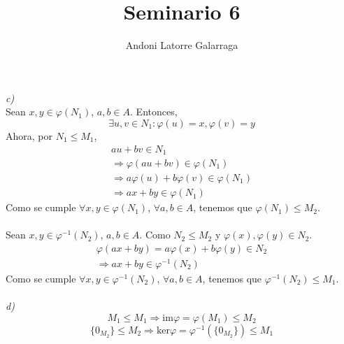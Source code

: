 \documentclass{article}
\title{Seminario 6}
\author{Andoni Latorre Galarraga}
\date{}
\begin{document}
\maketitle
\begin{multicols}{2}
\section{}
\noindent\textit{c)}\\
Sean $x,y\in \varphi(N_1)$, $a,b\in A$. Entonces,
$$
\exists u,v\in N_1 : \varphi(u)=x, \varphi(v)=y
$$
Ahora, por $N_1 \le M_1$,
$$
\begin{array}{c}
au+bv\in N_1 \\
\Rightarrow \varphi(au+bv)\in\varphi(N_1) \\
\Rightarrow a\varphi(u)+b\varphi(v)\in\varphi(N_1) \\
\Rightarrow ax+by\in\varphi(N_1)
\end{array}
$$
Como se cumple $\forall x,y\in\varphi(N_1)$, $\forall a,b\in A$, tenemos que $\varphi(N_1)\le M_2$.\\\\
Sean $x,y\in\varphi^{-1}(N_2)$, $a,b\in A$. Como $N_2\le M_2$ y $\varphi(x),\varphi(y)\in N_2$.
$$
\begin{array}{c}
\varphi(ax+by)=a\varphi(x)+b\varphi(y)\in N_2 \\
\Rightarrow ax+by\in \varphi^{-1}(N_2)
\end{array}
$$
Como se cumple $\forall x,y\in\varphi^{-1}(N_2)$, $\forall a,b\in A$, tenemos que $\varphi^{-1}(N_2)\le M_1$.\\\\
\textit{d)}
$$
M_1\le M_1 \Rightarrow \text{im}\varphi=\varphi(M_1)\le M_2
$$
$$
\{0_{M_2}\}\le M_2 \Rightarrow \text{ker}\varphi=\varphi^{-1}(\{0_{M_2}\})\le M_1
$$

\end{multicols}
\end{document}

